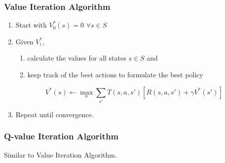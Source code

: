 \documentclass[a4paper]{article}
\begin{document}
\subsubsection{Value Iteration Algorithm}
\begin{enumerate}
	\item Start with $V_0^*(s) = 0$ $\forall s \in S$
	\item Given $V_i^*$,
	\begin{enumerate}[label=\roman*.]
		\item calculate the values for all states $s \in S$ and
		\item keep track of the best actions to formulate the best policy
	\end{enumerate}
	$$ 
	V^*(s) \leftarrow \max_a \sum_{s'} T(s,a,s') [R(s,a,s') + \gamma V^*(s')] 
	$$
	\item Repeat until convergence.
\end{enumerate}

\subsubsection{Q-value Iteration Algorithm}
Similar to Value Iteration Algorithm.
\end{document}
